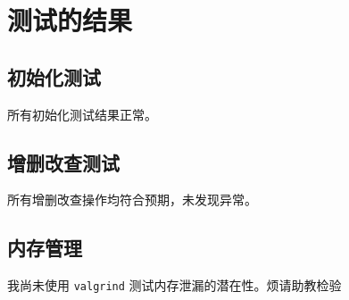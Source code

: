 \documentclass[UTF8]{ctexart}
\begin{document}
\section{测试的结果}

\subsection{初始化测试}
所有初始化测试结果正常。

\subsection{增删改查测试}
所有增删改查操作均符合预期，未发现异常。

\subsection{内存管理}
我尚未使用 \texttt{valgrind} 测试内存泄漏的潜在性。烦请助教检验
\end{document}

